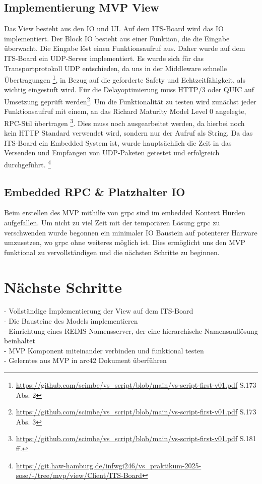 \documentclass{article}
\begin{document}
\subsection{Implementierung MVP View}
Das View besteht aus den IO und UI. Auf dem ITS-Board wird das IO implementiert. Der Block IO besteht aus einer Funktion, die die Eingabe überwacht. Die Eingabe löst einen Funktionsaufruf aus.
Daher wurde auf dem ITS-Board ein UDP-Server implementiert. Es wurde sich für das Transportprotokoll UDP entschieden, da uns in der Middleware schnelle Übertragungen \footnote{\url{https://github.com/scimbe/vs_script/blob/main/vs-script-first-v01.pdf} S.173 Abs. 2}, in Bezug auf die
geforderte Safety und Echtzeitfähigkeit, als wichtig eingestuft wird. Für die Delayoptimierung muss HTTP/3 oder QUIC auf Umsetzung geprüft werden\footnote{\url{https://github.com/scimbe/vs_script/blob/main/vs-script-first-v01.pdf} S.173 Abs. 3}.
Um die Funktionalität zu testen wird zunächst jeder Funktionsaufruf mit einem, an das Richard Maturity Model Level 0 angelegte, RPC-Stil übertragen \footnote{\url{https://github.com/scimbe/vs_script/blob/main/vs-script-first-v01.pdf} S.181 ff.}. Dies muss noch ausgearbeitet werden, da hierbei noch kein HTTP Standard verwendet wird, sondern nur der Aufruf als String.
Da das ITS-Board ein Embedded System ist, wurde hauptsächlich die Zeit in das Versenden und Empfangen von UDP-Paketen getestet und erfolgreich durchgeführt.
\footnote{\url{https://git.haw-hamburg.de/infwgi246/vs_praktikum-2025-sose/-/tree/mvp/view/Client/ITS-Board}} 

\subsection{Embedded RPC \& Platzhalter IO}
Beim erstellen des MVP mithilfe von grpc sind im embedded Kontext Hürden aufgefallen. Um nicht zu viel Zeit mit der temporären Lösung grpc zu verschwenden wurde begonnen ein minimaler IO Baustein auf potenterer Harware umzusetzen, wo grpc ohne weiteres möglich ist. 
Dies ermöglicht uns den MVP funktional zu vervollständigen und die nächsten Schritte zu beginnen. 
 
\section{Nächste Schritte}
- Vollständige Implementierung der View auf dem ITS-Board \\
- Die Bausteine des Models implementieren \\
- Einrichtung eines REDIS Namensserver, der eine hierarchische Namensauflösung beinhaltet \\
- MVP Komponent miteinander verbinden und funktional testen \\
- Gelerntes aus MVP in arc42 Dokument überführen
\end{document}
